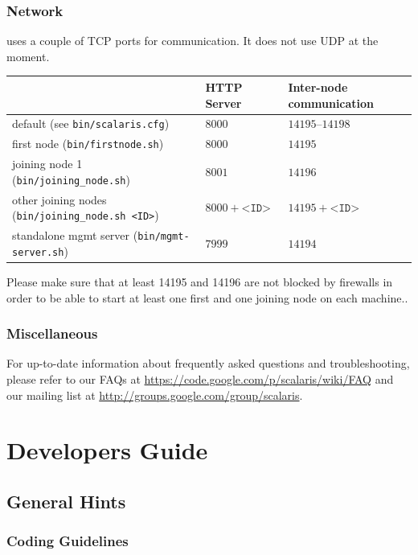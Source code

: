 \documentclass[a4paper]{scrreprt}
\newcommand{\code}[1]{\lstinline[basicstyle=\ttfamily]!#1!}
\begin{document}
\section{Network}

\scalaris{} uses a couple of TCP ports for communication. It does
not use UDP at the moment.

\begin{center}
\begin{tabular}{lll}
\toprule
 & HTTP Server & Inter-node communication \\
\midrule
default (see \code{bin/scalaris.cfg})                 & $8000$    & $14195$--$14198$ \\
first node (\code{bin/firstnode.sh})                  & $8000$    & $14195$          \\
joining node 1 (\code{bin/joining_node.sh})           & $8001$    & $14196$          \\
other joining nodes (\code{bin/joining_node.sh <ID>}) & $8000+\texttt{<ID>}$ & $14195+\texttt{<ID>}$ \\
standalone mgmt server (\code{bin/mgmt-server.sh})    & $7999$    & $14194$          \\
\bottomrule
\end{tabular}
\end{center}

Please make sure that at least 14195 and 14196 are not blocked by
firewalls in order to be able to start at least one first and one joining node
on each machine..

\section{Miscellaneous}
For up-to-date information about frequently asked questions and
troubleshooting, please refer to our FAQs at
\url{https://code.google.com/p/scalaris/wiki/FAQ} and our mailing list at
\url{http://groups.google.com/group/scalaris}.


\part{Developers Guide}

\chapter{General Hints}

\section{Coding Guidelines}
\end{document}
